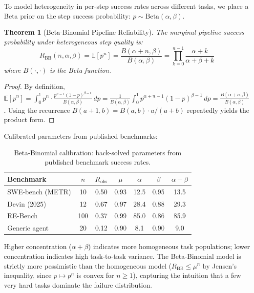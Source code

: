 \documentclass[11pt, a4paper, logo, copyright]{googledeepmind}
\newcommand{\E}{\mathbb{E}}
\newtheorem{theorem}{Theorem}[section]
\begin{document}
\begin{appendices}
To model heterogeneity in per-step success rates across different tasks,
we place a Beta prior on the step success probability:
$p \sim \mathrm{Beta}(\alpha, \beta)$.

\begin{theorem}[Beta-Binomial Pipeline Reliability]
The marginal pipeline success probability under heterogeneous step quality is:
\[
  R_{\mathrm{BB}}(n, \alpha, \beta)
    = \E[p^n]
    = \frac{B(\alpha + n, \beta)}{B(\alpha, \beta)}
    = \prod_{k=0}^{n-1} \frac{\alpha + k}{\alpha + \beta + k}
\]
where $B(\cdot, \cdot)$ is the Beta function.
\end{theorem}

\begin{proof}
By definition, $\E[p^n] = \int_0^1 p^n \cdot \frac{p^{\alpha-1}(1-p)^{\beta-1}}{B(\alpha,\beta)} \, dp
= \frac{1}{B(\alpha,\beta)} \int_0^1 p^{\alpha+n-1}(1-p)^{\beta-1} \, dp
= \frac{B(\alpha+n, \beta)}{B(\alpha,\beta)}$.
Using the recurrence $B(a+1,b) = B(a,b) \cdot a/(a+b)$ repeatedly yields
the product form.
\end{proof}

Calibrated parameters from published benchmarks:

\begin{table}[htbp]
\centering
\caption{Beta-Binomial calibration: back-solved parameters from published benchmark success rates.}
\label{tab:ext-betabinom}
\small
\begin{tabular}{lcccccc}
\toprule
\textbf{Benchmark} & $n$ & $R_{\mathrm{obs}}$ & $\mu$ & $\alpha$ & $\beta$ & $\alpha{+}\beta$ \\
\midrule
SWE-bench (METR) & 10 & 0.50 & 0.93 & 12.5 & 0.95 & 13.5 \\
Devin (2025) & 12 & 0.67 & 0.97 & 28.4 & 0.88 & 29.3 \\
RE-Bench & 100 & 0.37 & 0.99 & 85.0 & 0.86 & 85.9 \\
Generic agent & 20 & 0.12 & 0.90 & 8.1 & 0.90 & 9.0 \\
\bottomrule
\end{tabular}
\end{table}

Higher concentration ($\alpha + \beta$) indicates more homogeneous task
populations; lower concentration indicates high task-to-task variance.
The Beta-Binomial model is strictly more pessimistic than the homogeneous model
($R_{\mathrm{BB}} \leq \mu^n$ by Jensen's inequality, since $p \mapsto p^n$
is convex for $n \geq 1$), capturing the intuition that a few very hard tasks
dominate the failure distribution.


\end{appendices}
\end{document}
